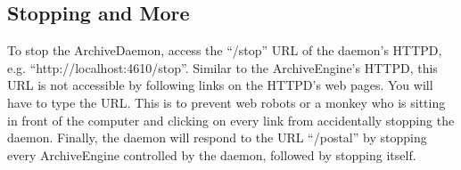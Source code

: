 \subsection{Stopping and More}
To stop the ArchiveDaemon, access the ``/stop'' URL of the daemon's
HTTPD, e.g. ``http://localhost:4610/stop''.  Similar to the
ArchiveEngine's HTTPD, this URL is not accessible by following links
on the HTTPD's web pages. You will have to type the URL. This is to
prevent web robots or a monkey who is sitting in front of the computer
and clicking on every link from accidentally stopping the daemon.
Finally, the daemon will respond to the URL ``/postal'' by stopping every
ArchiveEngine controlled by the daemon, followed by stopping itself.
